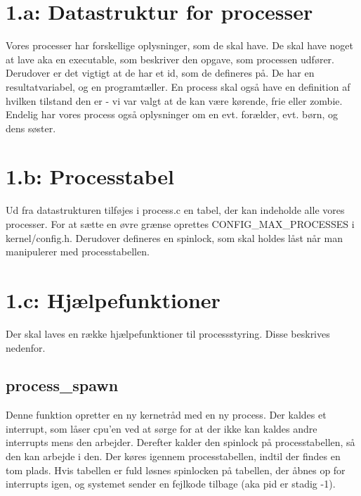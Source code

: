 \documentclass[10pt,a4paper,danish]{article}
\title{}
\author{Maria Caroline Miller, 040779, twq135 \\ Søren Pilgård, 190689, vpb984}
\begin{document}
\maketitle
\newpage


\section{1.a: Datastruktur for processer}
Vores processer har forskellige oplysninger, som de skal have. De skal have noget at lave aka en executable, som beskriver den opgave, som processen udfører. Derudover er det vigtigt at de har et id, som de defineres på. De har en resultatvariabel, og en programtæller. En process skal også have en definition af hvilken tilstand den er - vi var valgt at de kan være kørende, frie eller zombie. Endelig har vores process også oplysninger om en evt. forælder, evt. børn, og dens søster.

\section{1.b: Processtabel}
Ud fra datastrukturen tilføjes i process.c en tabel, der kan indeholde alle vores processer. For at sætte en øvre grænse oprettes CONFIG\_MAX\_PROCESSES i kernel/config.h. Derudover defineres en spinlock, som skal holdes låst når man manipulerer med processtabellen.

\section{1.c: Hjælpefunktioner}
Der skal laves en række hjælpefunktioner til processstyring. Disse beskrives nedenfor.

\subsection{process\_spawn}
Denne funktion opretter en ny kernetråd med en ny process. Der kaldes et interrupt, som låser cpu'en ved at sørge for at der ikke kan kaldes andre interrupts mens den arbejder. Derefter kalder den spinlock på processtabellen, så den kan arbejde i den. Der køres igennem processtabellen, indtil der findes en tom plads. Hvis tabellen er fuld løsnes spinlocken på tabellen, der åbnes op for interrupts igen, og systemet sender en fejlkode tilbage (aka pid er stadig -1).\\
\end{document}
